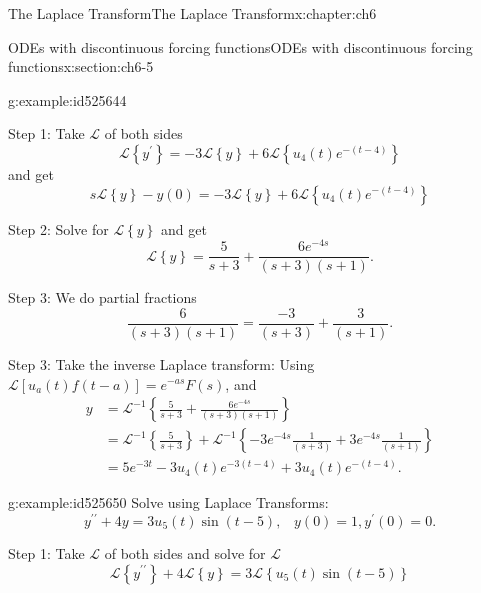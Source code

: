 \documentclass[oneside,10pt,]{book}
\numberwithin{equation}{section}
\numberwithin{equation}{section}
\newcommand{\amp}{&}
\begin{document}
\begin{chapterptx}{The Laplace Transform}{}{The Laplace Transform}{}{}{x:chapter:ch6}
\begin{sectionptx}{ODEs with discontinuous forcing functions}{}{ODEs with discontinuous forcing functions}{}{}{x:section:ch6-5}
\begin{example}{}{g:example:id525644}
\begin{equation*}
\end{equation*}
%
\par
Step 1: Take \(\mathcal{L}\) of both sides%
\begin{equation*}
\mathcal{L}\left\{ y^{\prime}\right\} =-3\mathcal{L}\left\{ y\right\} +6\mathcal{L}\left\{ u_{4}(t)e^{-\left(t-4\right)}\right\} 
\end{equation*}
and get%
\begin{equation*}
s\mathcal{L}\left\{ y\right\} -y(0)=-3\mathcal{L}\left\{ y\right\} +6\mathcal{L}\left\{ u_{4}(t)e^{-\left(t-4\right)}\right\} 
\end{equation*}
%
\par
Step 2: Solve for \(\mathcal{L}\left\{ y\right\} \) and get%
\begin{equation*}
\mathcal{L}\left\{ y\right\} =\frac{5}{s+3}+\frac{6e^{-4s}}{\left(s+3\right)\left(s+1\right)}.
\end{equation*}
%
\par
Step 3: We do partial fractions%
\begin{equation*}
\frac{6}{\left(s+3\right)\left(s+1\right)}=\frac{-3}{\left(s+3\right)}+\frac{3}{\left(s+1\right)}.
\end{equation*}
%
\par
Step 3: Take the inverse Laplace transform: Using \(\mathcal{L}\left[u_{a}(t)f(t-a)\right]=e^{-as}F(s)\), and%
\begin{align*}
y \amp =\mathcal{L}^{-1}\left\{ \frac{5}{s+3}+\frac{6e^{-4s}}{\left(s+3\right)\left(s+1\right)}\right\} \\
\amp =\mathcal{L}^{-1}\left\{ \frac{5}{s+3}\right\} +\mathcal{L}^{-1}\left\{ -3e^{-4s}\frac{1}{\left(s+3\right)}+3e^{-4s}\frac{1}{\left(s+1\right)}\right\} \\
\amp =5e^{-3t}-3u_{4}(t)e^{-3\left(t-4\right)}+3u_{4}(t)e^{-\left(t-4\right)}.
\end{align*}
%
\end{example}
\begin{example}{}{g:example:id525650}%
Solve using Laplace Transforms:%
\begin{equation*}
y^{\prime\prime}+4y=3u_{5}(t)\sin\left(t-5\right),\,\,\,\,\,y(0)=1,y^{\prime}(0)=0.
\end{equation*}
%
\par
Step 1: Take \(\mathcal{L}\) of both sides and solve for \(\mathcal{L}\)%
\begin{equation*}
\mathcal{L}\left\{ y^{\prime\prime}\right\} +4\mathcal{L}\left\{ y\right\} =3\mathcal{L}\left\{ u_{5}(t)\sin\left(t-5\right)\right\} 

\end{equation*}
\end{example}
\end{sectionptx}
\end{chapterptx}
\end{document}

